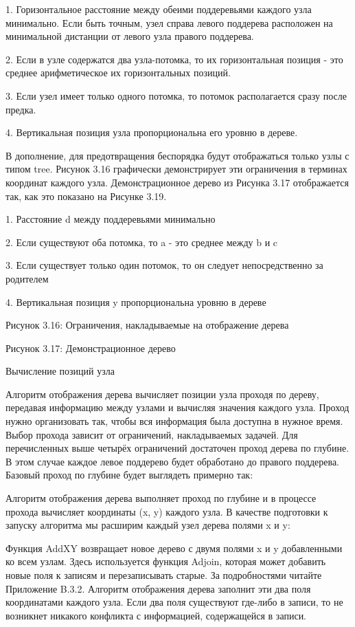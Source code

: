 1. Горизонтальное расстояние между обеими поддеревьями каждого узла минимально. Если быть точным, узел справа левого поддерева расположен на минимальной дистанции от левого узла правого поддерева.

2. Если в узле содержатся два узла-потомка, то их горизонтальная позиция - это среднее арифметическое их горизонтальных позиций.

3. Если узел имеет только одного потомка, то потомок располагается сразу после предка.

4. Вертикальная позиция узла пропорциональна его уровню в дереве.

В дополнение, для предотвращения беспорядка будут отображаться только узлы с типом tree. Рисунок 3.16 графически демонстрирует эти ограничения в терминах координат каждого узла. Демонстрационное дерево из Рисунка 3.17 отображается так, как это показано на Рисунке 3.19.

1. Расстояние d между поддеревьями минимально

2. Если существуют оба потомка, то a - это среднее между b и c

3. Если существует только один потомок, то он следует непосредственно за родителем

4. Вертикальная позиция y пропорциональна уровню в дереве

Рисунок 3.16: Ограничения, накладываемые на отображение дерева

Рисунок 3.17: Демонстрационное дерево

Вычисление позиций узла

Алгоритм отображения дерева вычисляет позиции узла проходя по дереву, передавая информацию между узлами и вычисляя значения каждого узла. Проход нужно организовать так, чтобы вся информация была доступна в нужное время. Выбор прохода зависит от ограничений, накладываемых задачей. Для перечисленных выше четырёх ограничений достаточен проход дерева по глубине. В этом случае каждое левое поддерево будет обработано до правого поддерева. Базовый проход по глубине будет выглядеть примерно так:

Алгоритм отображения дерева выполняет проход по глубине и в процессе прохода вычисляет координаты (x, y) каждого узла. В качестве подготовки к запуску алгоритма мы расширим каждый узел дерева полями x и y:

Функция AddXY возвращает новое дерево с двумя полями x и y добавленными ко всем узлам. Здесь используется функция Adjoin, которая может добавить новые поля к записям и перезаписывать старые. За подробностями читайте Приложение B.3.2. Алгоритм отображения дерева заполнит эти два поля координатами каждого узла. Если два поля существуют где-либо в записи, то не возникнет никакого конфликта с информацией, содержащейся в записи.

